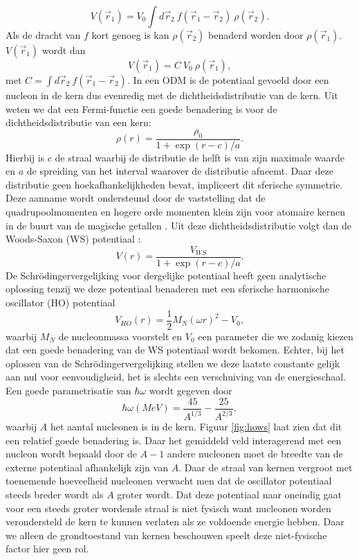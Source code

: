 \documentclass[11pt,twoside]{book}
\begin{document}
\begin{equation}
V(\vec{r}_1)  = V_0 \int d\vec{r}_2 \ f(\vec{r}_1 - \vec{r}_2) \ \rho (\vec{r}_2).
\end{equation}
Als de dracht van $f$ kort genoeg is kan $\rho (\vec{r}_2)$ benaderd worden door $\rho (\vec{r}_1)$. $V(\vec{r}_1)$ wordt dan
\begin{equation}
V(\vec{r}_1)  = C\  V_0  \ \rho (\vec{r}_1),
\end{equation} 
met $C = \int d\vec{r}_2\ f(\vec{r}_1-\vec{r}_2)$.
In een ODM  is de potentiaal gevoeld door een nucleon in de kern dus evenredig met de dichtheidsdistributie van de kern. Uit \cite{povh2008particles} weten we dat een Fermi-functie een goede benadering is voor de dichtheidsdistributie van een kern:
\begin{equation}
\rho (r) = \frac{\rho_0}{1+\exp{(r-c)/a}}.
\end{equation}
Hierbij is $c$ de straal waarbij de distributie de helft is van zijn maximale waarde en $a$ de spreiding van het interval waarover de distributie afneemt. Daar deze distributie geen hoekafhankelijkheden bevat, impliceert dit sferische symmetrie. Deze aanname wordt ondersteund door de vaststelling dat de quadrupoolmomenten en hogere orde momenten klein zijn voor atomaire kernen in de buurt van de magische getallen \cite{symmetry_shape}. 
Uit deze dichtheidsdistributie volgt dan de Woods-Saxon (WS) potentiaal \cite{povh2008particles}:
\begin{equation} \label{eq:ws_potential}
V(r)  = \frac{V_{WS}  }{1+\exp{(r-c)/a}}.
\end{equation}
De Schr\"{o}dingervergelijking voor dergelijke potentiaal heeft geen analytische oplossing tenzij we deze potentiaal benaderen met een sferische harmonische oscillator (HO) potentiaal 
\begin{equation} \label{eq:HO_potential}
V_{HO}(r) = \frac{1}{2} M_N (\omega r)^2- V_0,
\end{equation}
waarbij $M_N$ de nucleonmassa voorstelt en $V_0$ een parameter die we zodanig kiezen dat een goede benadering van de WS potentiaal wordt bekomen. Echter, bij het oplossen van de Schr\"{o}dingervergelijking stellen we deze laatste constante gelijk aan nul voor eenvoudigheid, het is slechts een verschuiving van de energieschaal. Een goede parametrisatie van $\hbar \omega$ \cite{maarten} wordt gegeven door
\begin{equation} \label{eq:omega}
\hbar\omega (MeV) = \frac{45}{A^{1/3}}-\frac{25}{A^{2/3}},
\end{equation}
waarbij $A$ het aantal nucleonen is in de kern. Figuur \ref{fig:hows} laat zien dat dit een relatief goede benadering is. Daar het gemiddeld veld interagerend met een nucleon wordt bepaald door de $A-1$ andere nucleonen moet de breedte van de externe potentiaal afhankelijk zijn van $A$. Daar de straal van kernen vergroot met toenemende hoeveelheid nucleonen verwacht men dat de oscillator potentiaal steeds breder wordt als $A$ groter wordt. Dat deze potentiaal naar oneindig gaat voor een steeds groter wordende straal is niet fysisch want nucleonen worden verondersteld de kern te kunnen verlaten als ze voldoende energie hebben. Daar we alleen de grondtoestand van kernen beschouwen speelt deze niet-fysische factor hier geen rol.
\end{document}

